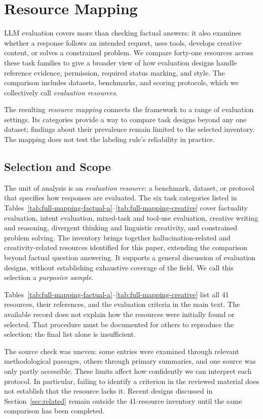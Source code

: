 \documentclass{clv2025}
\begin{document}
\section{Resource Mapping}\label{sec:methodology}

LLM evaluation covers more than checking factual answers: it also examines
whether a response follows an intended request, uses tools, develops creative
content, or solves a constrained problem. We compare forty-one resources
across these task families to give a broader view of how evaluation designs
handle reference evidence, permission, required status marking, and style.
The comparison includes datasets, benchmarks, and scoring protocols, which
we collectively call \emph{evaluation resources}.

The resulting \emph{resource mapping} connects the framework to a range of
evaluation settings. Its categories provide a way to compare task designs
beyond any one dataset; findings about their prevalence remain limited to
the selected inventory. The mapping does not test the labeling rule's
reliability in practice.

\subsection{Selection and Scope}

The unit of analysis is an \emph{evaluation resource}: a benchmark, dataset,
or protocol that specifies how responses are evaluated. The six task categories listed in
Tables~\ref{tab:full-mapping-factual-a}--\ref{tab:full-mapping-creative} cover factuality evaluation, intent evaluation,
mixed-task and tool-use evaluation, creative writing and reasoning, divergent
thinking and linguistic creativity, and constrained problem solving.
The inventory brings together hallucination-related and creativity-related
resources identified for this paper, extending the comparison beyond
factual question answering. It supports a general discussion of evaluation
designs, without establishing exhaustive coverage of the field. We call
this selection a \emph{purposive sample}.

Tables~\ref{tab:full-mapping-factual-a}--\ref{tab:full-mapping-creative}
list all 41 resources, their references, and the evaluation criteria in the
main text. The available record does not explain how the resources were
initially found or selected. That procedure must be documented for others
to reproduce the selection; the final list alone is insufficient.

The source check was uneven: some entries were examined through relevant
methodological passages, others through primary summaries, and one source
was only partly accessible. These limits affect how confidently we can
interpret each protocol. In particular, failing to identify a criterion
in the reviewed material does not establish that the resource lacks it.
Recent designs discussed in Section~\ref{sec:related} remain outside the
41-resource inventory until the same comparison has been completed.
\end{document}
